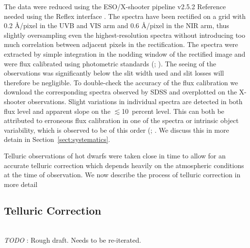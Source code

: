 \documentclass{aa}    %
\newcommand{\tablabel}[1]{\label{tab:#1}}
\newcommand{\sectionname}{Section}
\newcommand{\Sect}[1]{\sectionname~\ref{sect:#1}}
\newcommand{\sect}[1]{\Sect{#1}}
\newcommand{\sectlabel}[1]{\label{sect:#1}}
\newcommand{\todo}[3]{{\color{#2}\emph{#1}: #3}}
\newcommand{\jstodo}[1]{\todo{ \\TODO }{green}{#1}}
\begin{document}
The data were reduced using the ESO/X-shooter pipeline v2.5.2 {\color{red} Reference needed} using the Reflex interface \citep{Freudling2013}. The spectra have been rectified on a grid with 0.2 \AA/pixel in the UVB and VIS arm and 0.6 \AA/pixel in the NIR arm, thus slightly oversampling even the highest-resolution spectra without introducing too much correlation between adjacent pixels in the rectification. The spectra were extracted by simple integration in the nodding window of the rectified image and were flux calibrated using photometric standards (\cite{Vernet2010}; \cite{Hamuy1994}). The seeing of the observations was significantly below the slit width used and slit losses will therefore be negligible. To double-check the accuracy of the flux calibration we download the corresponding spectra observed by SDSS \citep{Ahn2014} and overplotted on the X-shooter observations. Slight variations in individual spectra are detected in both flux level and apparent slope on the $\lesssim$10~percent level. This can both be attributed to erroneous flux calibration in one of the spectra or intrinsic object variability, which is observed to be of this order (\cite{MacLeod2012}; \cite{Morganson2014}. We discuss this in more detain in \sect{systematics}.

Telluric observations of hot dwarfs were taken close in time to allow for an accurate telluric correction which depends heavily on the atmospheric conditions at the time of observation. We now describe the process of telluric correction in more detail



 \tablabel{targs}



\subsection{Telluric Correction}   \sectlabel{telluric}
\jstodo{Rough draft. Needs to be re-iterated.}
\end{document}
